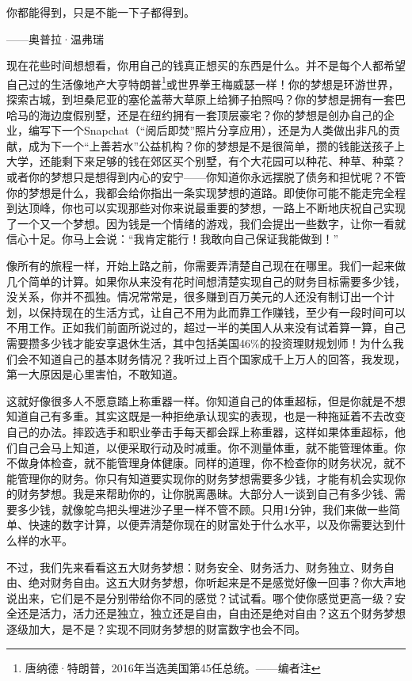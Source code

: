 \begin{BookQuote}
你都能得到，只是不能一下子都得到。

\hfill ——奥普拉·温弗瑞
\end{BookQuote}

现在花些时间想想看，你用自己的钱真正想买的东西是什么。并不是每个人都希望自己过的生活像地产大亨特朗普\footnote{\label{fn:pdf-15-3}唐纳德·特朗普，2016年当选美国第45任总统。——编者注}或世界拳王梅威瑟一样！你的梦想是环游世界，探索古城，到坦桑尼亚的塞伦盖蒂大草原上给狮子拍照吗？你的梦想是拥有一套巴哈马的海边度假别墅，还是在纽约拥有一套顶层豪宅？你的梦想是创办自己的企业，编写下一个Snapchat（“阅后即焚”照片分享应用），还是为人类做出非凡的贡献，成为下一个“上善若水”公益机构？你的梦想是不是很简单，攒的钱能送孩子上大学，还能剩下来足够的钱在郊区买个别墅，有个大花园可以种花、种草、种菜？或者你的梦想只是想得到内心的安宁——你知道你永远摆脱了债务和担忧呢？不管你的梦想是什么，我都会给你指出一条实现梦想的道路。即使你可能不能走完全程到达顶峰，你也可以实现那些对你来说最重要的梦想，一路上不断地庆祝自己实现了一个又一个梦想。因为钱是一个情绪的游戏，我们会提出一些数字，让你一看就信心十足。你马上会说：“我肯定能行！我敢向自己保证我能做到！”

像所有的旅程一样，开始上路之前，你需要弄清楚自己现在在哪里。我们一起来做几个简单的计算。如果你从来没有花时间想清楚实现自己的财务目标需要多少钱，没关系，你并不孤独。情况常常是，很多赚到百万美元的人还没有制订出一个计划，以保持现在的生活方式，让自己不用为此而靠工作赚钱，至少有一段时间可以不用工作。正如我们前面所说过的，超过一半的美国人从来没有试着算一算，自己需要攒多少钱才能安享退休生活，其中包括美国46\%的投资理财规划师！为什么我们会不知道自己的基本财务情况？我听过上百个国家成千上万人的回答，我发现，第一大原因是心里害怕，不敢知道。

这就好像很多人不愿意踏上称重器一样。你知道自己的体重超标，但是你就是不想知道自己有多重。其实这既是一种拒绝承认现实的表现，也是一种拖延着不去改变自己的办法。摔跤选手和职业拳击手每天都会踩上称重器，这样如果体重超标，他们自己会马上知道，以便采取行动及时减重。你不测量体重，就不能管理体重。你不做身体检查，就不能管理身体健康。同样的道理，你不检查你的财务状况，就不能管理你的财务。你只有知道要实现你的财务梦想需要多少钱，才能有机会实现你的财务梦想。我是来帮助你的，让你脱离愚昧。大部分人一谈到自己有多少钱、需要多少钱，就像鸵鸟把头埋进沙子里一样不管不顾。只用1分钟，我们来做一些简单、快速的数字计算，以便弄清楚你现在的财富处于什么水平，以及你需要达到什么样的水平。

不过，我们先来看看这五大财务梦想：财务安全、财务活力、财务独立、财务自由、绝对财务自由。这五大财务梦想，你听起来是不是感觉好像一回事？你大声地说出来，它们是不是分别带给你不同的感觉？试试看。哪个使你感觉更高一级？安全还是活力，活力还是独立，独立还是自由，自由还是绝对自由？这五个财务梦想逐级加大，是不是？实现不同财务梦想的财富数字也会不同。

